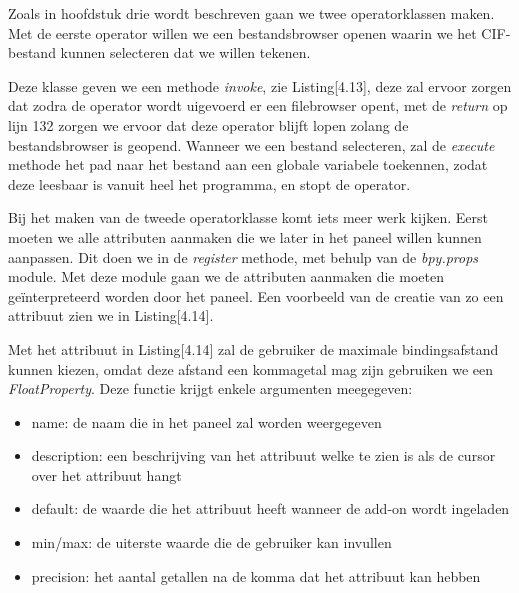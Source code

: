 Zoals in hoofdstuk drie wordt beschreven gaan we twee operatorklassen maken. Met de eerste operator willen we een bestandsbrowser openen waarin we het CIF-bestand kunnen selecteren dat we willen tekenen. 



Deze klasse geven we een methode \textit{invoke}, zie Listing[4.13], deze zal ervoor zorgen dat zodra de operator wordt uigevoerd er een filebrowser opent, met de \textit{return} op lijn 132 zorgen we ervoor dat deze operator blijft lopen zolang de bestandsbrowser is geopend. Wanneer we een bestand selecteren, zal de \textit{execute} methode het pad naar het bestand aan een globale variabele toekennen, zodat deze leesbaar is vanuit heel het programma, en stopt de operator.
\par 
Bij het maken van de tweede operatorklasse komt iets meer werk kijken. Eerst moeten we alle attributen aanmaken die we later in het paneel willen kunnen aanpassen. Dit doen we in de \textit{register} methode, met behulp van de \textit{bpy.props} module. Met deze module gaan we de attributen aanmaken die moeten geïnterpreteerd worden door het paneel. Een voorbeeld van de creatie van zo een attribuut zien we in Listing[4.14].      



Met het attribuut in Listing[4.14] zal de gebruiker de maximale bindingsafstand kunnen kiezen, omdat deze afstand een kommagetal mag zijn gebruiken we een \textit{FloatProperty}. Deze functie krijgt enkele argumenten meegegeven:

\begin{itemize}
\item name: de naam die in het paneel zal worden weergegeven
\item description: een beschrijving van het attribuut welke te zien is als de cursor over het attribuut hangt
\item default: de waarde die het attribuut heeft wanneer de add-on wordt ingeladen
\item min/max: de uiterste waarde die de gebruiker kan invullen
\item precision: het aantal getallen na de komma dat het attribuut kan hebben
\end{itemize}  

